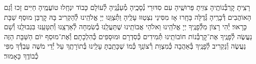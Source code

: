 \documentclass[twoside, openany, parskip=half, 11pt]{book}
\begin{document}
%
%
%
%
%
%



\sepline


רָצִֽיתָ קׇרְבְּ֯נוֹתֶֽיהָ צִוִּֽיתָ פֵּרוּשֶֽׁיהָ עִם סִדּוּרֵי נְ֯סָכֶֽיהָ מְ֯עַנְּ֯גֶֽיהָ לְ֯עוֹלָם כָּבוֹד יִנְחָֽלוּ טוֹעֲמֶֽיהָ חַיִּים זָכוּ וְ֯גַם הָאוֹהֲבִים דְּ֯בָרֶֽיהָ גְּ֯דֻלָּה בָּחָֽרוּ אָז מִסִּינַי נִצְטַוּוּ עָלֶֽיהָ
וַתְּ֯צַוֵּֽנוּ יְיָ אֱלֹהֵֽינוּ לְ֯הַקְרִיב בָּהּ קׇרְבַּן מוּסַף שַׁבָּת כָּרָאוּי׃ יְ֯הִי רָצוֹן מִלְּ֯פָנֶֽיךָ יְיָ אֱלֹהֵֽינוּ וֵאלֹהֵי אֲבוֹתֵֽינוּ שֶׁתַּעֲלֵֽנוּ בְ֯שִׂמְחָה לְ֯אַרְצֵֽנוּ וְ֯תִטָּעֵֽנוּ בִּגְבוּלֵֽנוּ וְ֯שָׁם נַעֲשֶׂה לְ֯פָנֶֽיךָ אֶת־קׇרְבְּ֯נוֹת חוֹבוֹתֵֽינוּ תְּ֯מִידִים כְּ֯סִדְרָם וּמוּסָפִים כְּ֯הִלְכָתָם׃ וְ֯אֶת־מוּסַף יוֹם הַשַּׁבָּת הַזֶּה נַעֲשֶׂה וְ֯נַקְרִיב לְ֯פָנֶֽיךָ בְּ֯אַהֲבָה כְּ֯מִצְוַת רְ֯צוֹנֶֽךָ כְּ֯מוֹ שֶׁכָּתַֽבְתָּ עָלֵֽינוּ בְּ֯תוֹרָתֶֽךָ עַל יְ֯דֵי מֹשֶׁה עַבְדְּ֯ךָ מִפִּי כְ֯בוֹדֶֽךָ כָּאָמוּר׃
\end{document}
